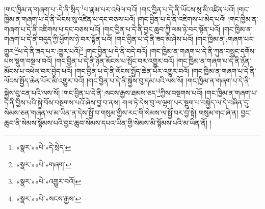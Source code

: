 །གང་ཁྱིམ་ན་གཞག་པ་:དེ་ནི་སྲིད་\footnote{«སྣར་»«པེ་»དེ་སྲེད་}པ་རྣམ་པར་འཕེལ་བའོ། །གང་བྱིན་པ་དེ་ནི་ཡོངས་སུ་མི་འཛིན་པའོ། །གང་ཁྱིམ་ན་གཞག་པ་དེ་ནི་ཡོངས་སུ་འཛིན་པ་དང་བཅས་པའོ། །གང་བྱིན་པ་དེ་ནི་འཇིགས་པ་མེད་པའོ། །གང་ཁྱིམ་ན་གཞག་པ་དེ་ནི་འཇིགས་པ་དང་བཅས་པའོ། །གང་བྱིན་པ་དེ་ནི་བྱང་ཆུབ་ཀྱི་ལམ་ཉེ་བར་སྟོན་པའོ། །གང་ཁྱིམ་ན་གཞག་པ་དེ་ནི་བདུད་ཀྱི་ཕྱོགས་ཉེ་བར་སྟོན་པའོ། །གང་བྱིན་པ་དེ་ནི་ཟད་མི་ཤེས་པའོ། །གང་ཁྱིམ་ན་:གཞག་པར་གྱུར་\footnote{«སྣར་»«པེ་»གཞག་}པ་དེ་ནི་ཟད་པར་:གྱུར་པའོ།\footnote{«སྣར་»«པེ་»འགྱུར་བའོ།} །གང་བྱིན་པ་དེ་ནི་བདེ་བའོ། །གང་ཁྱིམ་ན་གཞག་པ་དེ་ནི་ཀུན་བསྲུང་དགོས་པས་སྡུག་བསྔལ་བའོ། །གང་བྱིན་པ་དེ་ནི་ཉོན་མོངས་པ་སྤོང་བར་འགྱུར་བའོ། །གང་ཁྱིམ་ན་གཞག་པ་དེ་ནི་ཉོན་མོངས་པ་འཕེལ་བར་བྱེད་པའོ། །གང་བྱིན་པ་དེ་ནི་ལོངས་སྤྱོད་ཆེན་པོར་འགྱུར་བའོ། །གང་ཁྱིམ་ན་གཞག་པ་དེ་ནི་ལོངས་སྤྱོད་ཆེན་པོར་མི་འགྱུར་བའོ། །གང་བྱིན་པ་དེ་ནི་སྐྱེས་བུ་དམ་པའི་ལས་སོ། །གང་ཁྱིམ་ན་གཞག་པ་དེ་ནི་སྐྱེས་བུ་ངན་པའི་ལས་སོ། །གང་བྱིན་པ་དེ་ནི་:སངས་རྒྱས་ཐམས་ཅད་\footnote{«སྣར་»«པེ་»སངས་རྒྱས་}ཀྱིས་བསྔགས་པའོ། །གང་ཁྱིམ་ན་གཞག་པ་དེ་ནི་བྱིས་པའི་སྐྱེ་བོས་བསྔགས་པའོ་ཞེས་བྱ་བ་ནས། གལ་ཏེ་དེས་བུ་ལ་ལྷག་པར་སྡུག་པ་བསྐྱེད་ལ་དེ་བཞིན་དུ་སེམས་ཅན་གཞན་ལ་མ་ཡིན་ན་དེས་སྤྱོ་བ་གསུམ་གྱིས་རང་གི་སེམས་ལ་སྤྱོ་བར་བྱ་སྟེ། གསུམ་གང་ཞེ་ན། བྱང་ཆུབ་ནི་སེམས་སྙོམས་པའི་བྱང་ཆུབ་སེམས་དཔའ་ཡིན་གྱི་སེམས་མི་སྙོམས་པའི་མ་ཡིན་ནོ། །
